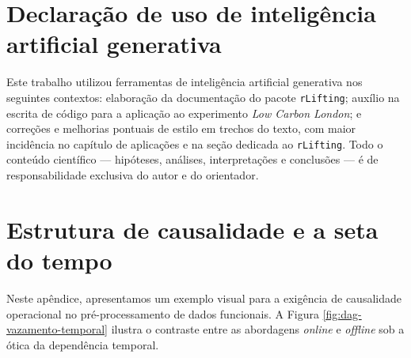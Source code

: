 \chapter{Declaração de uso de inteligência artificial generativa}\label{ap-declaracao-ia}

Este trabalho utilizou ferramentas de inteligência artificial generativa nos seguintes
contextos: elaboração da documentação do pacote \texttt{rLifting}; auxílio na escrita
de código para a aplicação ao experimento \emph{Low Carbon London}; e correções e
melhorias pontuais de estilo em trechos do texto, com maior incidência no capítulo de
aplicações e na seção dedicada ao \texttt{rLifting}. Todo o conteúdo científico ---
hipóteses, análises, interpretações e conclusões --- é de responsabilidade exclusiva do
autor e do orientador.

\chapter{Estrutura de causalidade e a seta do tempo}\label{ap-dag-causalidade}

Neste apêndice, apresentamos um exemplo visual para a exigência de causalidade operacional no pré-processamento de dados funcionais. 
A Figura \ref{fig:dag-vazamento-temporal} ilustra o contraste entre as abordagens \emph{online} e \emph{offline} sob a ótica da dependência temporal.

